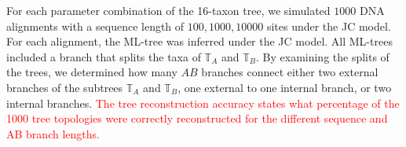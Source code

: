 \begin{appendices}
\begin{table}[hb]
{        For each parameter combination of the 16-taxon tree, we simulated  $1000$ DNA alignments with a sequence length of $100, 1000, 10000$ sites under the JC model. For each alignment, the ML-tree was inferred under the JC model. All ML-trees included a branch that splits the taxa of $\mathbb{T}_A$ and $\mathbb{T}_B$. By examining the splits of the trees, we determined how many $AB$ branches connect either two external branches of the subtrees $\mathbb{T}_A$ and $\mathbb{T}_B$, one external to one internal branch, or two internal branches.
        \textcolor{red}{The tree reconstruction accuracy states what percentage of the 1000 tree topologies were correctly reconstructed for the different sequence and AB branch lengths.}
   }
    \label{supptab:placementAB}
\end{table}\hfill\\


\end{appendices}
